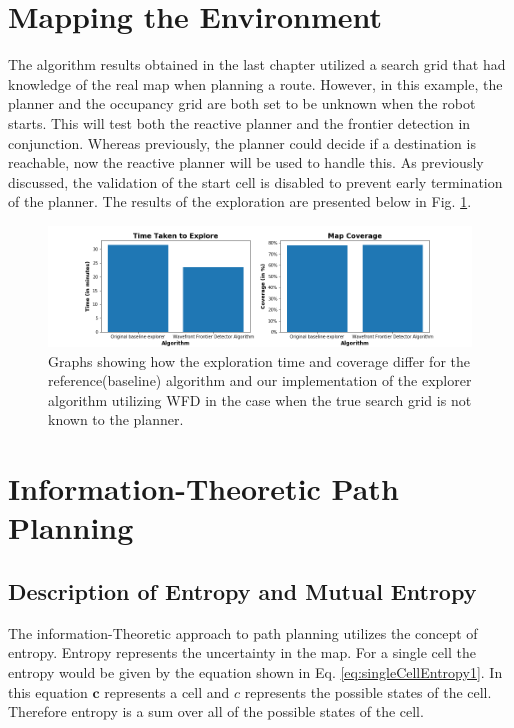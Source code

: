 \documentclass[a4paper,12pt]{article}
\begin{document}
	
	
	\section{Mapping the Environment}
		The algorithm results obtained in the last chapter utilized a search grid that had knowledge of the real map when planning a route. However, in this example, the planner and the occupancy grid are both set to be unknown when the robot starts. This will test both the reactive planner and the frontier detection in conjunction. Whereas previously, the planner could decide if a destination is reachable, now the reactive planner will be used to handle this. As previously discussed, the validation of the start cell is disabled to prevent early termination of the planner. The results of the exploration are presented below in Fig. \ref{Part3}. 

		\begin{figure}[H]
			\centering
			\includegraphics[scale=0.5]{images/Part3.png}
			\caption{Graphs showing how the exploration time and coverage differ for the reference(baseline) algorithm and our implementation of the explorer algorithm utilizing WFD in the case when the true search grid is not known to the planner.}
			\label{Part3}
		\end{figure}
	
	
	\section{Information-Theoretic Path Planning}
		
		\subsection{Description of Entropy and Mutual Entropy}
			The information-Theoretic approach to path planning utilizes the concept of entropy. Entropy represents the uncertainty in the map. For a single cell the entropy would be given by the equation shown in Eq. \ref{eq:singleCellEntropy1}. In this equation $\textbf{c}$ represents a cell and $c$ represents the possible states of the cell. Therefore entropy is a sum over all of the possible states of the cell.
\end{document}
